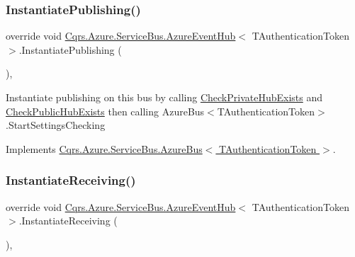 \subsubsection{\texorpdfstring{Instantiate\+Publishing()}{InstantiatePublishing()}}
{\footnotesize\ttfamily override void \hyperlink{classCqrs_1_1Azure_1_1ServiceBus_1_1AzureEventHub}{Cqrs.\+Azure.\+Service\+Bus.\+Azure\+Event\+Hub}$<$ T\+Authentication\+Token $>$.Instantiate\+Publishing (\begin{DoxyParamCaption}{ }\end{DoxyParamCaption})\hspace{0.3cm}{\ttfamily [protected]}, {\ttfamily [virtual]}}



Instantiate publishing on this bus by calling \hyperlink{classCqrs_1_1Azure_1_1ServiceBus_1_1AzureEventHub_a2da39ab1b2bc5fe995b6bd1fea461852_a2da39ab1b2bc5fe995b6bd1fea461852}{Check\+Private\+Hub\+Exists} and \hyperlink{classCqrs_1_1Azure_1_1ServiceBus_1_1AzureEventHub_aee7b4360172cf49fb2e885a3a525aa66_aee7b4360172cf49fb2e885a3a525aa66}{Check\+Public\+Hub\+Exists} then calling Azure\+Bus$<$\+T\+Authentication\+Token$>$.\+Start\+Settings\+Checking 



Implements \hyperlink{classCqrs_1_1Azure_1_1ServiceBus_1_1AzureBus_a0bacaa4619921333da4a27371c1d6d0a_a0bacaa4619921333da4a27371c1d6d0a}{Cqrs.\+Azure.\+Service\+Bus.\+Azure\+Bus$<$ T\+Authentication\+Token $>$}.

\mbox{\label{classCqrs_1_1Azure_1_1ServiceBus_1_1AzureEventHub_aa725781eddb65bdfe456a4fecb36fb6b_aa725781eddb65bdfe456a4fecb36fb6b}} 
\subsubsection{\texorpdfstring{Instantiate\+Receiving()}{InstantiateReceiving()}}
{\footnotesize\ttfamily override void \hyperlink{classCqrs_1_1Azure_1_1ServiceBus_1_1AzureEventHub}{Cqrs.\+Azure.\+Service\+Bus.\+Azure\+Event\+Hub}$<$ T\+Authentication\+Token $>$.Instantiate\+Receiving (\begin{DoxyParamCaption}{ }\end{DoxyParamCaption})\hspace{0.3cm}{\ttfamily [protected]}, {\ttfamily [virtual]}}



